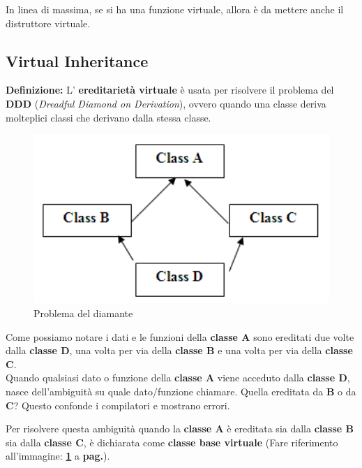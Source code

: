 \textsf{\small In linea di massima, se si ha una funzione virtuale, allora è da mettere anche il distruttore virtuale.} \break

\subsection{Virtual Inheritance}

\textsf{\small \textbf{Definizione:} L' \textbf{ereditarietà virtuale} è usata per risolvere il problema del \textbf{DDD} (\emph{Dreadful Diamond on Derivation}), ovvero quando una classe deriva molteplici classi che derivano dalla stessa classe.} \\

\begin{figure}[H]
	\centering
	\includegraphics[width=1\textwidth, height=1\textheight, keepaspectratio]{./imgs/diamond_problem2.png}
	\caption{Problema del diamante}
	\label{fig:diamond_problem}
\end{figure}

\textsf{\small Come possiamo notare i dati e le funzioni della \textbf{classe A} sono ereditati due volte dalla \textbf{classe D}, una volta per via della \textbf{classe B} e una volta per via della \textbf{classe C}.} \\

\textsf{\small Quando qualsiasi dato o funzione della \textbf{classe A} viene acceduto dalla \textbf{classe D}, nasce dell'ambiguità su quale dato/funzione chiamare. Quella ereditata da \textbf{B} o da \textbf{C}? Questo confonde i compilatori e mostrano errori.}

\textsf{\small Per risolvere questa ambiguità quando la \textbf{classe A} è ereditata sia dalla \textbf{classe B} sia dalla \textbf{classe C}, è dichiarata come \textbf{classe base virtuale} (Fare riferimento all'immagine: \textbf{\ref{fig:diamond_problem}} a \textbf{pag.\pageref{fig:diamond_problem}}).}

